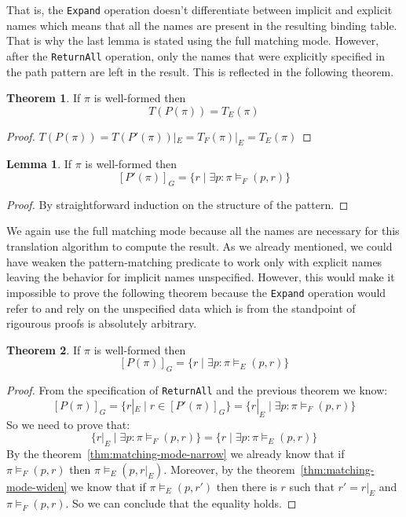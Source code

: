 \documentclass[14pt]{constructor-thesis}
\theoremstyle{definition}
\newtheorem{theorem}{Theorem}
\newtheorem{lemma}{Lemma}
\begin{document}
That is, the \texttt{Expand} operation doesn't differentiate between implicit and explicit names which means that all the names are present in the resulting binding table. That is why the last lemma is stated using the full matching mode. However, after the \texttt{ReturnAll} operation, only the names that were explicitly specified in the path pattern are left in the result. This is reflected in the following theorem.

\begin{theorem}
  \label{thm:neo4j-translation-type}
  If $\pi$ is well-formed then
  $$T(P(\pi)) = T_E(\pi)$$
\end{theorem}
\begin{proof}
  $ T(P(\pi)) = T(P'(\pi))|_E = T_F(\pi)|_E = T_E(\pi) $
\end{proof}

\begin{lemma} If $\pi$ is well-formed then
  $$[P'(\pi)]_G = \{ r \mid \exists p : \pi \models_F (p, r) \}$$
\end{lemma}
\begin{proof}
  By straightforward induction on the structure of the pattern.
\end{proof}

We again use the full matching mode because all the names are necessary for this translation algorithm to compute the result. As we already mentioned, we could have weaken the pattern-matching predicate to work only with explicit names leaving the behavior for implicit names unspecified. However, this would make it impossible to prove the following theorem because the \texttt{Expand} operation would refer to and rely on the unspecified data which is from the standpoint of rigourous proofs is absolutely arbitrary.

\begin{theorem} If $\pi$ is well-formed then
  $$[P(\pi)]_G = \{ r \mid \exists p : \pi \models_E (p, r) \}$$
\end{theorem}
\begin{proof} From the specification of \texttt{ReturnAll} and the previous theorem we know:
  $$[P(\pi)]_G = \{ r|_E \mid r \in [P'(\pi)]_G \} = \{ r|_E \mid \exists p : \pi \models_F (p, r) \} $$
  So we need to prove that:
  $$ \{ r|_E \mid \exists p : \pi \models_F (p, r) \} = \{ r \mid \exists p : \pi \models_E (p, r) \} $$
  By the theorem~\ref{thm:matching-mode-narrow} we already know that if $\pi \models_F (p, r)$ then $\pi \models_E (p, r|_E)$. Moreover, by the theorem~\ref{thm:matching-mode-widen} we know that if $\pi \models_E (p, r')$ then there is $r$ such that $r' = r|_E$ and $\pi \models_F (p, r)$. So we can conclude that the equality holds.
\end{proof}
\end{document}
